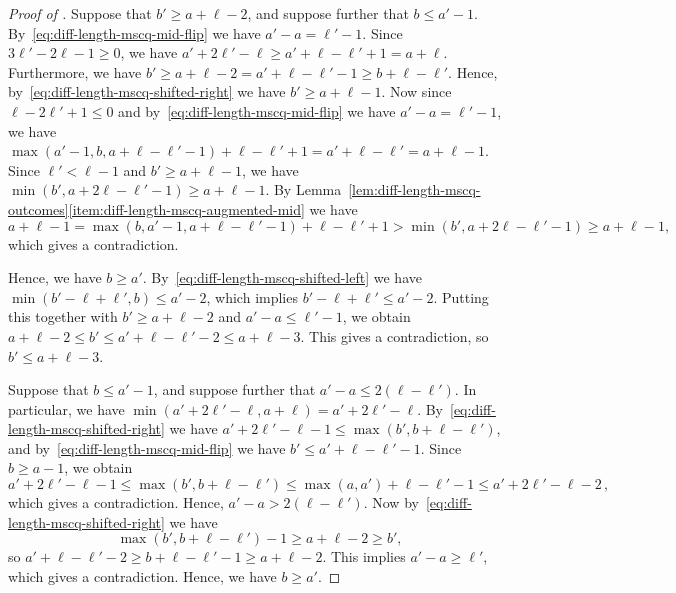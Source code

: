 \documentclass[12pt]{article}
\theoremstyle{plain}
\theoremstyle{definition}
\begin{document}
\begin{proof}[Proof of ]
		Suppose that $b'\ge a+\ell-2$, and suppose further that $b\le a'-1$. By~\eqref{eq:diff-length-mscq-mid-flip} we have $a'-a=\ell'-1$. Since $3\ell'-2\ell-1\ge0$, we have $a'+2\ell'-\ell\ge a'+\ell-\ell'+1 = a+\ell$. Furthermore, we have $b'\ge a+\ell-2=a'+\ell-\ell'-1\ge b+\ell-\ell'$. Hence, by~\eqref{eq:diff-length-mscq-shifted-right} we have $b'\ge a+\ell-1$. Now since $\ell-2\ell'+1\le0$ and by~\eqref{eq:diff-length-mscq-mid-flip} we have $a'-a=\ell'-1$, we have $\max(a'-1,b,a+\ell-\ell'-1) + \ell-\ell'+1 = a'+\ell-\ell' = a+\ell-1$. Since $\ell'<\ell-1$ and $b'\ge a+\ell-1$, we have $\min(b',a+2\ell-\ell'-1) \ge a+\ell-1$. By Lemma~\ref{lem:diff-length-mscq-outcomes}\ref{item:diff-length-mscq-augmented-mid} we have
		\[a+\ell-1=\max(b,a'-1,a+\ell-\ell'-1) + \ell-\ell'+1 > \min(b',a+2\ell-\ell'-1)\ge a+\ell-1,\]
		which gives a contradiction.
		
		Hence, we have $b\ge a'$. By~\eqref{eq:diff-length-mscq-shifted-left} we have $\min(b'-\ell+\ell',b)\le a'-2$, which implies $b'-\ell+\ell'\le a'-2$. Putting this together with $b'\ge a+\ell-2$ and $a'-a\le\ell'-1$, we obtain $a+\ell-2\le b'\le a'+\ell-\ell'-2\le a+\ell-3$. This gives a contradiction, so $b'\le a+\ell-3$.
		
		Suppose that $b\le a'-1$, and suppose further that $a'-a\le2(\ell-\ell')$. In particular, we have $\min(a'+2\ell'-\ell,a+\ell)=a'+2\ell'-\ell$. By~\eqref{eq:diff-length-mscq-shifted-right} we have $a'+2\ell'-\ell-1\le \max(b',b+\ell-\ell')$, and by~\eqref{eq:diff-length-mscq-mid-flip} we have $b'\le a'+\ell-\ell'-1$. Since $b\ge a-1$, we obtain
		\[a'+2\ell'-\ell-1\le\max(b',b+\ell-\ell')\le\max(a,a')+\ell-\ell'-1\le a'+2\ell'-\ell-2\,,\]
		which gives a contradiction. Hence, $a'-a>2(\ell-\ell')$. Now by~\eqref{eq:diff-length-mscq-shifted-right} we have
		\[\max(b',b+\ell-\ell')-1\ge a+\ell-2\ge b',\]
		so $a'+\ell-\ell'-2\ge b+\ell-\ell'-1\ge a+\ell-2$. This implies $a'-a\ge\ell'$, which gives a contradiction. Hence, we have $b\ge a'$.
		

\end{proof}
\end{document}
